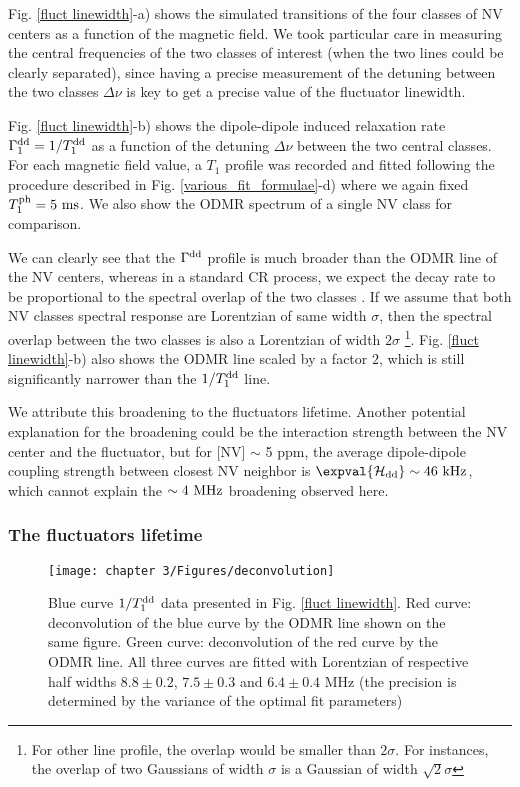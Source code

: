 \documentclass[a4paper, 11pt]{report}
\begin{document}
Fig. \ref{fluct linewidth}-a) shows the simulated transitions of the four classes of NV centers as a function of the magnetic field. We took particular care in measuring the central frequencies of the two classes of interest (when the two lines could be clearly separated), since having a precise measurement of the detuning between the two classes $\Delta \nu$ is key to get a precise value of the fluctuator linewidth.


Fig. \ref{fluct linewidth}-b) shows the dipole-dipole induced relaxation rate $\Gamma_1^{\rm dd}=1/T_1^{\rm dd}$ as a function of the detuning $\Delta \nu$ between the two central classes. For each magnetic field value, a $T_1$ profile was recorded and fitted following the procedure described in Fig. \ref{various_fit_formulae}-d) where we again fixed $T_1^{\rm ph}=5\ \rm ms$. We also show the ODMR spectrum of a single NV class for comparison.

We can clearly see that the $\Gamma^{\rm dd}$ profile is much broader than the ODMR line of the NV centers, whereas in a standard CR process, we expect the decay rate to be proportional to the spectral overlap of the two classes \citep{hall2016detection}. If we assume that both NV classes spectral response are Lorentzian of same width $\sigma$, then the spectral overlap between the two classes is also a Lorentzian of width $2 \sigma$ \footnote{For other line profile, the overlap would be smaller than $2 \sigma$. For instances, the overlap of two Gaussians of width $\sigma$ is a Gaussian of width $\sqrt{2} \sigma$}. Fig. \ref{fluct linewidth}-b) also shows the ODMR line scaled by a factor $2$, which is still significantly narrower than the $1/T_1^{\rm dd}$ line.

We attribute this broadening to the fluctuators lifetime. Another potential explanation for the broadening could be the interaction strength between the NV center and the fluctuator, but for [NV] $\sim$ 5 ppm, the average dipole-dipole coupling strength between closest NV neighbor is $\expval{\mathcal{H}_{\rm dd}} \sim 46\ \rm kHz$, which cannot explain the $\sim 4\ \rm MHz$ broadening observed here.

\subsubsection{The fluctuators lifetime}
\label{sec fluctuators lifetime}
\begin{figure}[h]
\centering
\texttt{[image: chapter 3/Figures/deconvolution]}
\caption{Blue curve $1/T_1^{\rm dd}$ data presented in Fig. \ref{fluct linewidth}. Red curve: deconvolution of the blue curve by the ODMR line shown on the same figure. Green curve: deconvolution of the red curve   by the ODMR line. All three curves are fitted with Lorentzian of respective half widths $8.8 \pm 0.2$, $7.5 \pm 0.3$ and $6.4 \pm 0.4$ MHz (the precision is determined by the variance of the optimal fit parameters)}
\label{deconvolution}
\end{figure}
\end{document}
